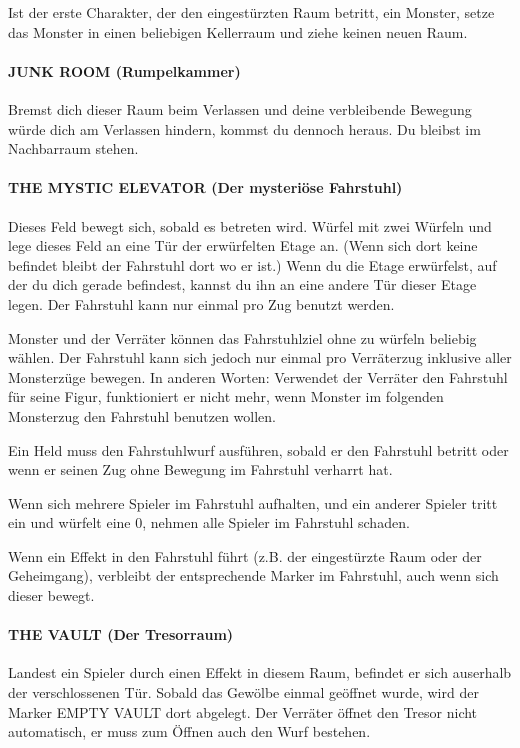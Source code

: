 Ist der erste Charakter, der den eingestürzten Raum betritt, ein Monster, setze das Monster in einen beliebigen Kellerraum und ziehe keinen neuen Raum.

\paragraph{JUNK ROOM (Rumpelkammer)}

Bremst dich dieser Raum beim Verlassen und deine verbleibende Bewegung würde dich am Verlassen hindern, kommst du dennoch heraus. Du bleibst im Nachbarraum stehen.

\paragraph{THE MYSTIC ELEVATOR (Der mysteriöse Fahrstuhl)}

Dieses Feld bewegt sich, sobald es betreten wird. Würfel mit zwei Würfeln und lege dieses Feld an eine Tür der erwürfelten Etage an. (Wenn sich dort keine befindet bleibt der Fahrstuhl dort wo er ist.) Wenn du die Etage erwürfelst, auf der du dich gerade befindest, kannst du ihn an eine andere Tür dieser Etage legen. Der Fahrstuhl kann nur einmal pro Zug benutzt werden.

Monster und der Verräter können das Fahrstuhlziel ohne zu würfeln beliebig wählen. Der Fahrstuhl kann sich jedoch nur einmal pro Verräterzug inklusive aller Monsterzüge bewegen. In anderen Worten: Verwendet der Verräter den Fahrstuhl für seine Figur, funktioniert er nicht mehr, wenn Monster im folgenden Monsterzug den Fahrstuhl benutzen wollen.

Ein Held muss den Fahrstuhlwurf ausführen, sobald er den Fahrstuhl betritt oder wenn er seinen Zug ohne Bewegung im Fahrstuhl verharrt hat.

Wenn sich mehrere Spieler im Fahrstuhl aufhalten, und ein anderer Spieler tritt ein und würfelt eine 0, nehmen alle Spieler im Fahrstuhl schaden.

Wenn ein Effekt in den Fahrstuhl führt (z.B. der eingestürzte Raum oder der Geheimgang), verbleibt der entsprechende Marker im Fahrstuhl, auch wenn sich dieser bewegt.

\paragraph{THE VAULT (Der Tresorraum)}

Landest ein Spieler durch einen Effekt in diesem Raum, befindet er sich auserhalb der verschlossenen Tür. Sobald das Gewölbe einmal geöffnet wurde, wird der Marker EMPTY VAULT dort abgelegt. Der Verräter öffnet den Tresor nicht automatisch, er muss zum Öffnen auch den Wurf bestehen.


